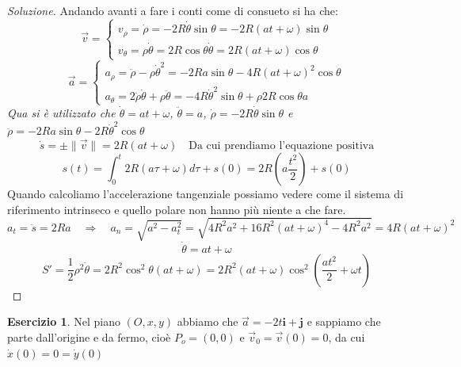 \documentclass[11pt,a4paper,twoside]{article}
\theoremstyle{definition}
\newtheorem{ese}{Esercizio}[section]
\newenvironment{sol}
	{\renewcommand\qedsymbol{$\blacksquare$}\begin{proof}[Soluzione]}
	{\end{proof}}
\begin{document}
\begin{sol}
	Andando avanti a fare i conti come di consueto si ha che:
	\[\vec v = \begin{cases}
		v_\rho = \dot \rho = -2R \dot \theta \sin \theta = - 2R(at + \omega) \sin \theta\\
		v_\theta = \rho \dot \theta = 2R \cos \theta \dot \theta = 2R(at + \omega )\cos \theta
	\end{cases}\]
	\[ \vec a = \begin{cases}
		a_\rho = \ddot \rho - \rho \dot \theta^2 = -2Ra\sin\theta -4R(at + \omega)^2\cos \theta\\
		a_\theta = 2 \dot \rho \dot \theta + \rho \ddot \theta = -4R\dot \theta^2 \sin \theta + \rho 2 R \cos \theta a
	\end{cases} \]
	\textit{Qua si è utilizzato che $\dot \theta = at + \omega$, $\ddot \theta = a$, $\dot \rho = -2R\dot \theta \sin \theta$ e $\ddot \rho = -2Ra \sin \theta -2R \dot \theta^2 \cos \theta$}
	\[\dot s = \pm \|\vec v\| = 2R(at + \omega) \quad \text{Da cui prendiamo l'equazione positiva}\]
	\[ s(t) = \int_0^t 2R(a \tau + \omega)d \tau + s(0) = 2R\left( a\frac {t^2}2 \right) + s(0) \]
	Quando calcoliamo l'accelerazione tangenziale possiamo vedere come il sistema di riferimento intrinseco e quello polare non hanno più niente a che fare.
	\[ a_t = \ddot s = 2Ra \quad \Rightarrow \quad a_n = \sqrt{a^2 - a_t^2} = \sqrt{4 R^2a^2 + 16 R^2(at + \omega)^4 - 4R^2a^2} = 4R(at + \omega)^2\]
	\[\dot \theta = at + \omega\]
	\[ S' = \frac 12 \rho^2 \dot \theta = 2R^2 \cos^2 \theta(at + \omega) = 2R^2 (at + \omega) \cos^2\left( \frac{at^2}2 + \omega t \right)\]
\end{sol}

\begin{ese}
	Nel piano $(O, x, y)$ abbiamo che $\vec a = -2t \mathbf i + \mathbf j$ e sappiamo che parte dall'origine e da fermo, cioè $P_o = (0,0)$ e $\vec v_0 = \vec v(0) = 0$, da cui $\dot x (0)= 0 = \dot y(0)$
\end{ese}
\end{document}
